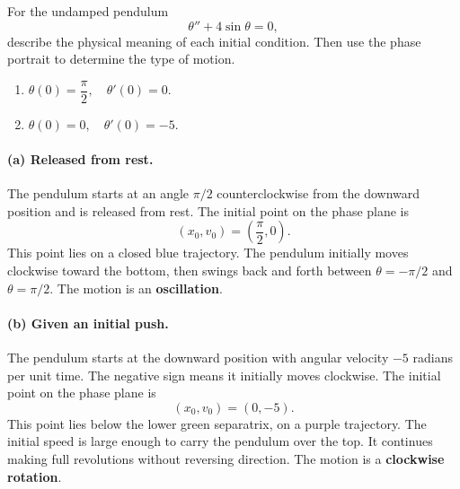 \documentclass[11pt,letterpaper]{article}
\begin{document}
\begin{example}[2]{
For the undamped pendulum
\[
\theta''+4\sin\theta=0,
\]
describe the physical meaning of each initial condition.
Then use the phase portrait to determine the type of motion.

\begin{enumerate}
    \item[(a)] $\theta(0)=\dfrac{\pi}{2},\quad \theta'(0)=0.$
    \item[(b)] $\theta(0)=0,\quad \theta'(0)=-5.$
\end{enumerate}
}

\paragraph{(a) Released from rest.}
The pendulum starts at an angle $\pi/2$ counterclockwise
from the downward position and is released from rest.
The initial point on the phase plane is
\[
(x_0,v_0)=\left(\frac{\pi}{2},0\right).
\]
This point lies on a closed blue trajectory.
The pendulum initially moves clockwise toward the bottom,
then swings back and forth between
$\theta=-\pi/2$ and $\theta=\pi/2$.
The motion is an \textbf{oscillation}.

\paragraph{(b) Given an initial push.}
The pendulum starts at the downward position with
angular velocity $-5$ radians per unit time.
The negative sign means it initially moves clockwise.
The initial point on the phase plane is
\[
(x_0,v_0)=(0,-5).
\]
This point lies below the lower green separatrix,
on a purple trajectory. The initial speed is large
enough to carry the pendulum over the top.
It continues making full revolutions without reversing
direction. The motion is a \textbf{clockwise rotation}.

\end{example}
\end{document}
